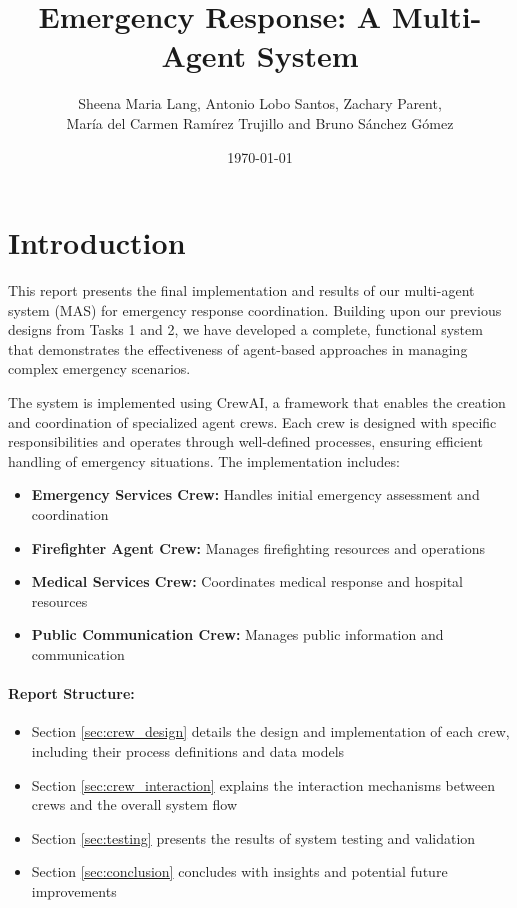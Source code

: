 \documentclass[a4paper]{article}
\title{Emergency Response: A Multi-Agent System}
\author{Sheena Maria Lang, Antonio Lobo Santos, Zachary Parent, \\ María del Carmen Ramírez Trujillo and Bruno Sánchez Gómez}
\date{\today}
\begin{document}
\maketitle
\tableofcontents
\newpage

\section{Introduction}
This report presents the final implementation and results of our multi-agent system (MAS) for emergency response coordination. Building upon our previous designs from Tasks 1 and 2, we have developed a complete, functional system that demonstrates the effectiveness of agent-based approaches in managing complex emergency scenarios.

The system is implemented using CrewAI, a framework that enables the creation and coordination of specialized agent crews. Each crew is designed with specific responsibilities and operates through well-defined processes, ensuring efficient handling of emergency situations. The implementation includes:

\begin{itemize}
    \item \textbf{Emergency Services Crew:} Handles initial emergency assessment and coordination
    \item \textbf{Firefighter Agent Crew:} Manages firefighting resources and operations
    \item \textbf{Medical Services Crew:} Coordinates medical response and hospital resources
    \item \textbf{Public Communication Crew:} Manages public information and communication
\end{itemize}

\paragraph{Report Structure:}
\begin{itemize}
    \item Section \ref{sec:crew_design} details the design and implementation of each crew, including their process definitions and data models
    \item Section \ref{sec:crew_interaction} explains the interaction mechanisms between crews and the overall system flow
    \item Section \ref{sec:testing} presents the results of system testing and validation
    \item Section \ref{sec:conclusion} concludes with insights and potential future improvements
\end{itemize}
\end{document}
